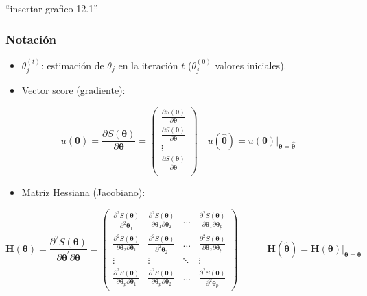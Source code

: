 \documentclass[
]{article}
\providecommand{\tightlist}{%
  \setlength{\itemsep}{0pt}\setlength{\parskip}{0pt}}
\begin{document}
``insertar grafico 12.1''

\hypertarget{notaciuxf3n}{%
\subsubsection{Notación}\label{notaciuxf3n}}

\begin{itemize}
\item
  \(\theta_{j}^{(t)}\): estimación de \(\theta_{j}\) en la iteración \(t\) (\(\theta_{j}^{(0)}\) valores iniciales).
\item
  Vector score (gradiente):
\end{itemize}

\[
u(\boldsymbol \theta)=\frac{\partial S(\boldsymbol \theta)}{\partial\boldsymbol \theta}=\begin{pmatrix} 
\frac{\partial S(\boldsymbol \theta)}{\partial\boldsymbol \theta} \\ 
\frac{\partial S(\boldsymbol \theta)}{\partial\boldsymbol \theta} \\
\vdots \\
\frac{\partial S(\boldsymbol \theta)}{\partial\boldsymbol \theta} \\
\end{pmatrix}
\quad
u(\hat{\boldsymbol \theta})=u(\boldsymbol \theta)|_{\boldsymbol \theta=\hat{\boldsymbol \theta}}
\]

\begin{itemize}
\tightlist
\item
  Matriz Hessiana (Jacobiano):
\end{itemize}

\[
\boldsymbol H(\boldsymbol \theta)=  \frac{\partial^2 S(\boldsymbol \theta)}{\partial\boldsymbol \theta^{'} \partial\boldsymbol \theta}=\begin{pmatrix} \frac{\partial^2 S(\boldsymbol \theta)}{\partial^2 \boldsymbol \theta_{1}} & \frac{\partial^2 S(\boldsymbol \theta)}{\partial \boldsymbol \theta_{1} \partial \boldsymbol \theta_{2} } & \dots & \frac{\partial^2 S(\boldsymbol \theta)}{\partial \boldsymbol \theta_{1} \partial \boldsymbol \theta_{p}} \\
\frac{\partial^2 S(\boldsymbol \theta)}{\partial \boldsymbol \theta_{2} \partial \boldsymbol \theta_{1}} & \frac{\partial^2 S(\boldsymbol \theta)}{\partial^2 \boldsymbol \theta_{2}} & \dots & \frac{\partial^2 S(\boldsymbol \theta)}{\partial \boldsymbol \theta_{2} \partial \boldsymbol \theta_{p}}\\
\vdots & \vdots & \ddots & \vdots \\
\frac{\partial^2 S(\boldsymbol \theta)}{\partial \boldsymbol \theta_{p} \partial \boldsymbol \theta_{1}} & \frac{\partial^2 S(\boldsymbol \theta)}{\partial \boldsymbol \theta_{p} \partial \boldsymbol \theta_{2}} & \dots & \frac{\partial^2 S(\boldsymbol \theta)}{\partial^2 \boldsymbol \theta_{p}}
\end{pmatrix} \quad \quad \quad \boldsymbol H(\hat{\boldsymbol \theta})=\boldsymbol H(\boldsymbol \theta)|_{\boldsymbol \theta=\hat{\boldsymbol \theta}}
\]
\end{document}

